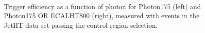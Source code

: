 \begin{figure}[h!]
  \begin{center}
     ~~\
     \\
    \caption{Trigger efficiency as a function of photon \Pt for Photon175 (left) and Photon175 OR ECALHT800 (right), measured with events in the JetHT data set passing the \gj control region selection. %
    }
    \label{fig:photon_turnons_photonPt}
  \end{center}
\end{figure}




